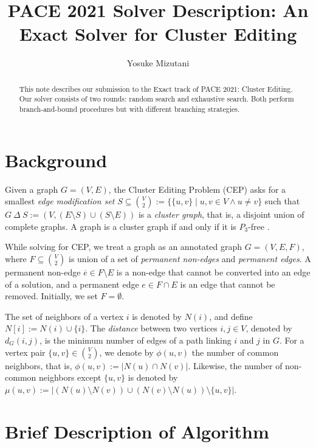 \documentclass[a4paper,UKenglish,cleveref, autoref, thm-restate]{lipics-v2021}
\title{PACE 2021 Solver Description: An Exact Solver for Cluster Editing} %
\author{Yosuke Mizutani}{School of Computing, University of Utah, USA}{yos@cs.utah.edu}{}{}%
\begin{document}
\maketitle

\begin{abstract}
This note describes our submission to the Exact track of PACE 2021: Cluster Editing. Our solver consists of two rounds: random search and exhaustive search. Both perform branch-and-bound procedures but with different branching strategies.
\end{abstract}

\section{Background}
\label{sec:typesetting-summary}

Given a graph $G=(V,E)$, the Cluster Editing Problem (CEP) asks for a smallest \textit{edge modification set} $S \subseteq \binom{V}{2} := \{\{u,v\} \mid u,v \in V \wedge u \neq v\}$ such that $G \ \Delta\ S := (V,(E \setminus S) \cup (S \setminus E))$ is a \textit{cluster graph}, that is, a disjoint union of complete graphs. A graph is a cluster graph if and only if it is $P_3$-free \cite{shamir2004cluster}.

While solving for CEP, we treat a graph as an annotated graph $G=(V,E,F)$, where $F \subseteq \binom{V}{2}$ is union of a set of \textit{permanent non-edges} and \textit{permanent edges}. A permanent non-edge $\overline{e} \in F \setminus E$ is a non-edge that cannot be converted into an edge of a solution, and a permanent edge $e \in F \cap E$ is an edge that cannot be removed. Initially, we set $F=\emptyset$.

The set of neighbors of a vertex $i$ is denoted by $N(i)$, and define $N[i] := N(i) \cup \{i\}$. The \textit{distance} between two vertices $i,j\in V$, denoted by $d_G(i,j)$, is the minimum number of edges of a path linking $i$ and $j$ in $G$. For a vertex pair $\{u,v\} \in \binom{V}{2}$, we denote by $\phi(u,v)$ the number of common neighbors, that is, $\phi(u,v):=|N(u)\cap N(v)|$. Likewise, the number of non-common neighbors except $\{u,v\}$ is denoted by $\mu(u,v):=|(N(u)\setminus N(v)) \cup (N(v)\setminus N(u))\setminus \{u,v\}|$.

\section{Brief Description of Algorithm}
\end{document}

